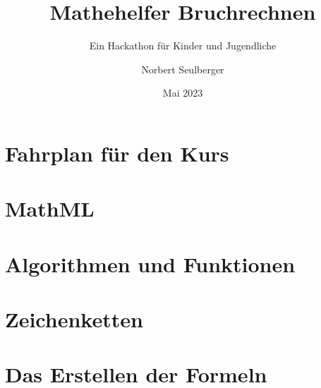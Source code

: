 \documentclass[12p,numbers=noendperiod,DIV=15]{scrreprt}
\begin{document}
	
\title{Mathehelfer Bruchrechnen}
\subtitle{Ein Hackathon für Kinder und Jugendliche}
\author{Norbert Seulberger}
\date{Mai 2023}

\maketitle

\tableofcontents

\chapter{Fahrplan für den Kurs}

%

\chapter{MathML}




\chapter{Algorithmen und Funktionen}








\chapter{Zeichenketten}



\chapter{Das Erstellen der Formeln}





%
%
%
%
%
%
%

%
%
%
%
\end{document}
